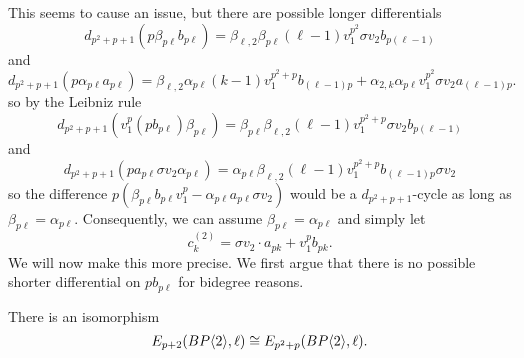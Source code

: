 This seems to cause an issue, but %
there are possible longer differentials 
\[ 
	d_{p^2+p+1}(p\beta_{p\ell}b_{p\ell})=\beta_{\ell,2}\beta_{p\ell}(\ell-1) v_1^{p^2}\sigma v_2b_{p(\ell-1)}
\]
and 
\[
	d_{p^2+p+1}(p\alpha_{p\ell}a_{p\ell}) = \beta_{\ell,2} \alpha_{p\ell}(k-1)v_1^{p^2+p} b_{(\ell-1)p}+\alpha_{2,k}\alpha_{p\ell}v_1^{p^2}\sigma v_2a_{(\ell-1)p}.
\]
so by the Leibniz rule
\[ 
	d_{p^2+p+1}(v_1^p(pb_{p\ell})\beta_{p\ell})=\beta_{p\ell}\beta_{\ell,2}(\ell-1) v_1^{p^2+p}\sigma v_2b_{p(\ell-1)}
\]
and 
\[
	d_{p^2+p+1}(pa_{p\ell}\sigma v_2\alpha_{p\ell} ) = \alpha_{p\ell}\beta_{\ell,2} (\ell-1) v_1^{p^2+p} b_{(\ell-1)p}\sigma v_2
\]
so the difference $p(\beta_{p\ell}b_{p\ell}v_1^p-\alpha_{p\ell}a_{p\ell} \sigma v_2)$ would be a $d_{p^2+p+1}$-cycle as long as $\beta_{p\ell}=\alpha_{p\ell}$. Consequently, we can assume $\beta_{p\ell}=\alpha_{p\ell}$ and simply let 
\[ c_k^{(2)}= \sigma v_2 \cdot a_{pk}+ v_1^{p} b_{pk}.\]
We will now make this more precise. We first argue that there is no possible shorter differential on $pb_{p\ell}$ for bidegree reasons. 
\begin{lem}
There is an isomorphism 
\[E_{p+2}(BP\langle 2 \rangle,\ell)\cong E_{p^2+p}(BP\langle 2 \rangle,\ell).\]
\end{lem}
